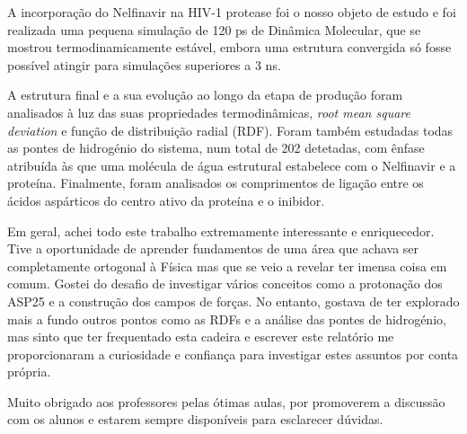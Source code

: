 \documentclass[12pt,a4paper]{article}
\begin{document}
	A incorporação do Nelfinavir na HIV-1 protease foi o nosso objeto de estudo e foi realizada uma pequena simulação de 120 ps de Dinâmica Molecular, que se mostrou termodinamicamente estável, embora uma estrutura convergida só fosse possível atingir para simulações superiores a 3 ns.
	
	A estrutura final e a sua evolução ao longo da etapa de produção foram analisados à luz das suas propriedades termodinâmicas, \textit{root mean square deviation} e função de distribuição radial (RDF).	Foram também estudadas todas as pontes de hidrogénio do sistema, num total de 202 detetadas, com ênfase atribuída às que uma molécula de água estrutural estabelece com o Nelfinavir e a proteína. Finalmente, foram analisados os comprimentos de ligação entre os ácidos aspárticos do centro ativo da proteína e o inibidor.
	
	Em geral, achei todo este trabalho extremamente interessante e enriquecedor. Tive a oportunidade de aprender fundamentos de uma área que achava ser completamente ortogonal à Física mas que se veio a revelar ter imensa coisa em comum. Gostei do desafio de investigar vários conceitos como a protonação dos ASP25 e a construção dos campos de forças. No entanto, gostava de ter explorado mais a fundo outros pontos como as RDFs e a análise das pontes de hidrogénio, mas sinto que ter frequentado esta cadeira e escrever este relatório me proporcionaram a curiosidade e confiança para investigar estes assuntos por conta própria.
	
	Muito obrigado aos professores pelas ótimas aulas, por promoverem a discussão com os alunos e estarem sempre disponíveis para esclarecer dúvidas.
\newpage


\end{document}
